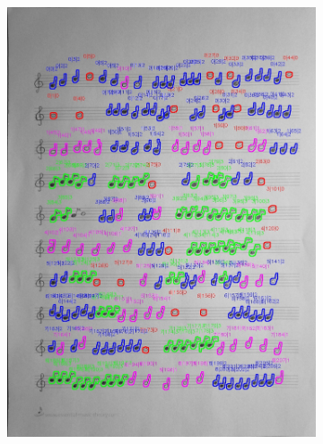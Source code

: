 \documentclass[11pt]{article}
\begin{document}
\begin{figure}[H]
\begin{subfigure}{.45\textwidth}
        \includegraphics[width=\linewidth]{10_cnts.jpg}
        \label{fig:sub2}
    \end{subfigure}
    \label{fig:test}
\end{figure}
\end{document}
